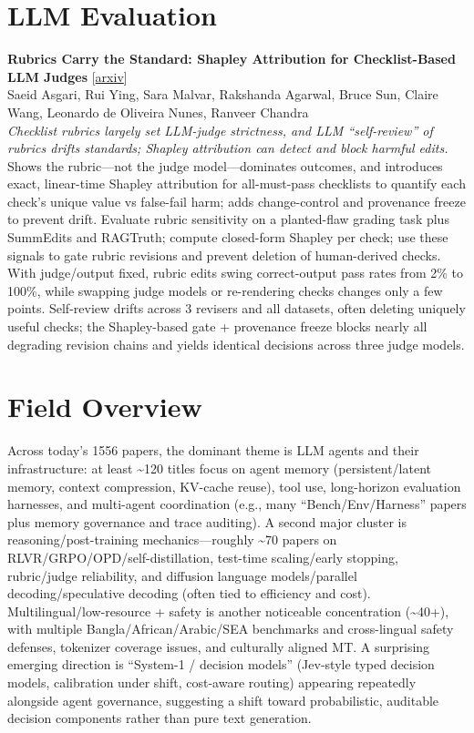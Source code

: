 \documentclass[12pt,letterpaper]{article}
\begin{document}
\medskip


\section*{LLM Evaluation}

{\small\textbf{Rubrics Carry the Standard: Shapley Attribution for Checklist-Based LLM Judges}} {\scriptsize[\href{https://arxiv.org/abs/2610.24971}{arxiv}]}\\
{\scriptsize Saeid Asgari, Rui Ying, Sara Malvar, Rakshanda Agarwal, Bruce Sun, Claire Wang, Leonardo de Oliveira Nunes, Ranveer Chandra}\\

{\small\textit{Checklist rubrics largely set LLM-judge strictness, and LLM ``self-review'' of rubrics drifts standards; Shapley attribution can detect and block harmful edits.}}\\[1pt]
{\footnotesize Shows the rubric---not the judge model---dominates outcomes, and introduces exact, linear-time Shapley attribution for all-must-pass checklists to quantify each check's unique value vs false-fail harm; adds change-control and provenance freeze to prevent drift. Evaluate rubric sensitivity on a planted-flaw grading task plus SummEdits and RAGTruth; compute closed-form Shapley per check; use these signals to gate rubric revisions and prevent deletion of human-derived checks. With judge/output fixed, rubric edits swing correct-output pass rates from 2\% to 100\%, while swapping judge models or re-rendering checks changes only a few points. Self-review drifts across 3 revisers and all datasets, often deleting uniquely useful checks; the Shapley-based gate + provenance freeze blocks nearly all degrading revision chains and yields identical decisions across three judge models.}

\medskip



\section*{Field Overview}
{\footnotesize Across today's 1556 papers, the dominant theme is LLM agents and their infrastructure: at least \textasciitilde{}120 titles focus on agent memory (persistent/latent memory, context compression, KV-cache reuse), tool use, long-horizon evaluation harnesses, and multi-agent coordination (e.g., many ``Bench/Env/Harness'' papers plus memory governance and trace auditing). A second major cluster is reasoning/post-training mechanics---roughly \textasciitilde{}70 papers on RLVR/GRPO/OPD/self-distillation, test-time scaling/early stopping, rubric/judge reliability, and diffusion language models/parallel decoding/speculative decoding (often tied to efficiency and cost). Multilingual/low-resource + safety is another noticeable concentration (\textasciitilde{}40+), with multiple Bangla/African/Arabic/SEA benchmarks and cross-lingual safety defenses, tokenizer coverage issues, and culturally aligned MT. A surprising emerging direction is ``System-1 / decision models'' (Jev-style typed decision models, calibration under shift, cost-aware routing) appearing repeatedly alongside agent governance, suggesting a shift toward probabilistic, auditable decision components rather than pure text generation.}
\end{document}
